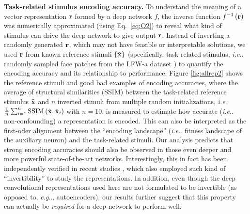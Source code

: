 \documentclass[fleqn]{article} %
\makeatletter
\DeclareRobustCommand\onedot{\futurelet\@let@token\@onedot}
\def\@onedot{\ifx\@let@token.\else.\null\fi\xspace}
\def\eg{\emph{e.g}\onedot} \def\Eg{\emph{E.g}\onedot}
\def\ie{\emph{i.e}\onedot} \def\Ie{\emph{I.e}\onedot}
\makeatother
\begin{document}
{\bf Task-related stimulus encoding accuracy.}
To understand the meaning of a vector representation ${\bf{r}}$ formed by a deep network $f$, the inverse function $f^{-1}\left( \bf{r} \right)$ {was} numerically approximated (using Eq.~\ref{eq:O2}) to reveal what kind of stimulus can drive the deep network to give output $\bf{r}$.
Instead of inverting a randomly generated $\bf{r}$, which may not have feasible or interpretable solutions, we {used} $\bf{r}$ from known reference stimuli $\lbrace\tilde{\bf{x}}\rbrace$ (specifically, task-related stimulus, \ie randomly sampled face patches from the LFW-a dataset \cite{wolf2011effective}) to quantify the encoding accuracy and its relationship to performance.
Figure \ref{fig:allrep2} shows the reference stimuli and good \vs bad examples of encoding accuracies, where the average of structural similarities (SSIM) \cite{wang2004image} between the task-related reference stimulus $\tilde{\bf{x}}$ and $n$ inverted stimuli from multiple random initializations, \ie $\frac{1}{n}\sum_{i=1}^{n} \mathrm{SSIM}\left(\tilde{\bf{x}} , \hat{{\bf{x}}}_i \right)$ with $n=10$, is measured to estimate how accurate (\ie non-confounding) a representation is encoded.
This can also be interpreted as the first-oder alignment between the ``encoding landscape'' (\ie fitness landscape of the auxiliary neuron) and the task-related stimuli.
Our analysis predicts that strong encoding accuracies should also be observed in those even deeper and more powerful state-of-the-art networks. 
Interestingly, this in fact has been independently verified in recent studies \cite{mahendran2014understanding, long2014convnets, razavian2014persistent}, which also employed such kind of ``invertibility'' to study the representations. %
In addition, even though the deep convolutional representations used here are not formulated to be invertible (as opposed to, \eg, autoencoders), our results further suggest that this property can actually be \emph{required} for a deep network to perform well.

\end{document}
